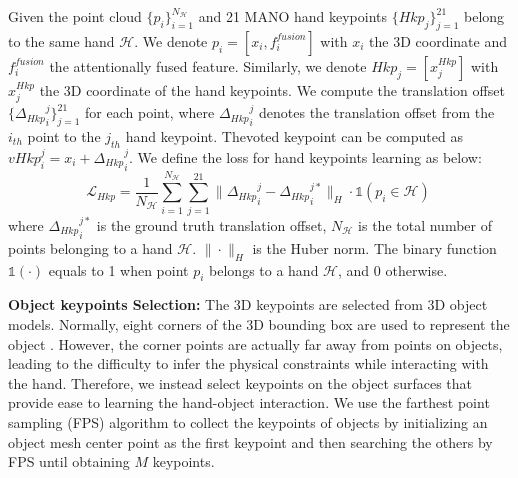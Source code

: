 Given the point cloud $\{ p_i \}^{N_{\mathcal{H}}}_{i=1}$ and 21 MANO hand keypoints $\{ Hkp_j \}^{21}_{j=1}$ belong to the same hand $\mathcal{H}$. We denote $p_i = [x_i, f^{fusion}_i]$ with $x_i$ the 3D coordinate and $f^{fusion}_i$ the attentionally fused feature. Similarly, we denote $Hkp_j = [x^{Hkp}_j]$ with $x^{Hkp}_j$ the 3D coordinate of the hand keypoints. We compute the translation offset $\{ {\Delta_{Hkp}}^j_i \}^{21}_{j=1}$ for each point, where ${\Delta_{Hkp}}^j_i$ denotes the translation offset from the $i_{th}$ point to the $j_{th}$ hand keypoint. Thevoted keypoint can be computed as $vHkp^j_i = x_i + {\Delta_{Hkp}}^j_i$. We define the loss for hand keypoints learning as below:
\begin{equation}
	\mathcal{L}_{Hkp} = \frac{1}{N_{\mathcal{H}}} \sum_{i=1}^{N_{\mathcal{H}}} \sum_{j=1}^{21} \|{\Delta_{Hkp}}^j_i - {\Delta_{Hkp}}^{j*}_i \|_H \cdot \mathds{1}(p_i \in \mathcal{H}) \
	\label{eq:loss_handjoints}
\end{equation}
where ${\Delta_{Hkp}}^{j*}_i$ is the ground truth translation offset, $N_{\mathcal{H}}$ is the total number of points belonging to a hand $\mathcal{H}$. $\| \cdot \|_H$ is the Huber norm. The binary function $\mathds{1}(\cdot)$ equals to 1 when point $p_i$ belongs to a hand $\mathcal{H}$, and 0 otherwise.

\textbf{Object keypoints Selection:} The 3D keypoints are selected from 3D object models. Normally, eight corners of the 3D bounding box are used to represent the object \cite{kong2020sia, doosti2020hope}. However, the corner points are actually far away from points on objects, leading to the difficulty to infer the physical constraints while interacting with the hand. Therefore, we instead select keypoints on the object surfaces that provide ease to learning the hand-object interaction. We use the farthest point sampling (FPS) algorithm to collect the keypoints of objects by initializing an object mesh center point as the first keypoint and then searching the others by FPS until obtaining $M$ keypoints. 

